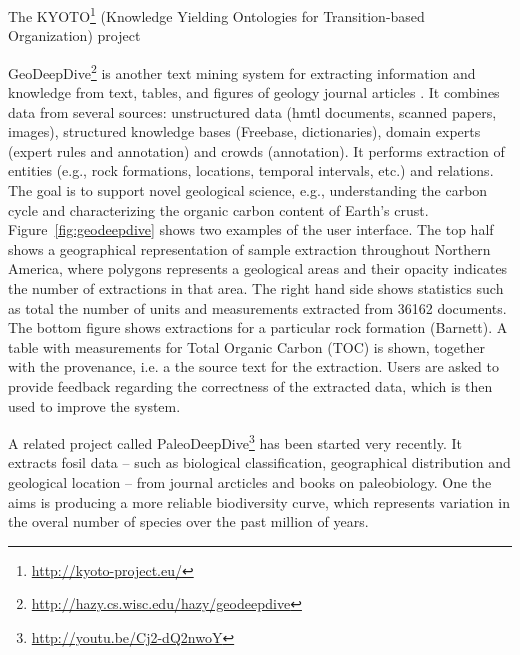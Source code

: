 The KYOTO\footnote{\url{http://kyoto-project.eu/}} (Knowledge Yielding Ontologies for Transition-based Organization) project  



GeoDeepDive\footnote{\url{http://hazy.cs.wisc.edu/hazy/geodeepdive}} is another text mining system for extracting information and knowledge from text, tables, and figures of geology journal articles \citep{Zhang2013GeoDeepDive}.
It combines data from several sources: unstructured data (hmtl documents, scanned papers, images), structured knowledge bases (Freebase, dictionaries), domain experts (expert rules and annotation) and crowds (annotation).
It performs extraction of entities (e.g., rock formations, locations, temporal intervals, etc.) and relations.
The goal is to support novel geological science, e.g., understanding the carbon cycle and characterizing the organic carbon content of Earth’s crust.
Figure~\ref{fig:geodeepdive} shows two examples of the user interface.
The top half shows a geographical representation of sample extraction throughout Northern America, where polygons represents a geological areas and their opacity indicates the number of extractions in that area.
The right hand side shows statistics such as total the number of units and measurements extracted from 36162 documents.
The bottom figure shows extractions for a particular rock formation (Barnett).
A table with measurements for Total Organic Carbon (TOC) is shown, together with the provenance, i.e. a the source text for the extraction.
Users are asked to provide feedback regarding the correctness of the extracted data, which is then used to improve the system.

A related project called PaleoDeepDive\footnote{\url{http://youtu.be/Cj2-dQ2nwoY}} has been started very recently.
It extracts fosil data -- such as biological classification, geographical distribution and geological location -- from journal arcticles and books on paleobiology.
One the aims is producing a more reliable biodiversity curve, which represents variation in the overal number of species over the past million of years.

